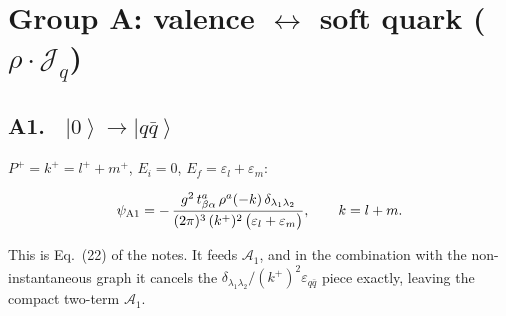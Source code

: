 \documentclass[11pt]{article}
\newcommand{\ibar}[2]{\draw[line width=1.1pt] (#1-0.13,#2) -- (#1+0.13,#2);}
\newcommand{\eps}{\varepsilon}
\newcommand{\ket}[1]{\left|#1\right\rangle}
\newcommand{\vac}{\ket{0}}
\newcommand{\A}{\mathcal{A}}\newcommand{\B}{\mathcal{B}}
\newcommand{\qk}[3]{q^{#1}_{#2}(#3)}
\newcommand{\aqk}[3]{\bar q^{#1}_{#2}(#3)}
\newcommand{\Jc}{\mathcal{J}}
\begin{document}
\section{Group A: valence $\leftrightarrow$ soft quark ($\rho\cdot\Jc_{q}$)}

\subsection*{A1. \ $\vac\to\ket{q\bar q}$}
\begin{center}
\end{center}
$P^{+}=k^{+}=l^{+}+m^{+}$, $E_{i}=0$, $E_{f}=\eps_{l}+\eps_{m}$:
\begin{res}
\begin{equation}
\psi_{\rm A1}=-\,\frac{g^{2}\,t^{a}_{\beta\alpha}\,\rho^{a}(-k)\,\delta_{\lambda_{1}\lambda_{2}}}
{(2\pi)^{3}\,(k^{+})^{2}\,\big(\eps_{l}+\eps_{m}\big)},\qquad k=l+m .
\label{eq:A1}
\end{equation}
\end{res}
\noindent
This is Eq.~(22) of the notes. It feeds $\A_{1}$, and in the combination with the
non-instantaneous graph it cancels the $\delta_{\lambda_{1}\lambda_{2}}/(k^{+})^{2}\eps_{q\bar q}$
piece exactly, leaving the compact two-term $\A_{1}$.
\end{document}
